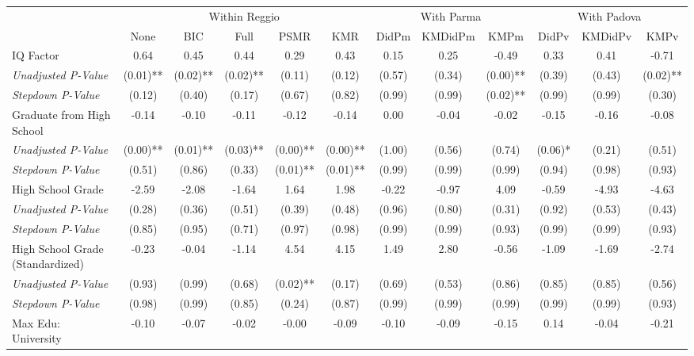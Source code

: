 \begin{tabular}{l c c c c c c c c c c c}
\toprule
& \multicolumn{5}{c}{Within Reggio} & \multicolumn{3}{c}{With Parma} & \multicolumn{3}{c}{With Padova} \\\cmidrule(lr){2-6} \cmidrule(lr){7-9} \cmidrule(lr){10-12}
 & None & BIC & Full & PSMR & KMR & DidPm & KMDidPm & KMPm & DidPv & KMDidPv & KMPv \\
\midrule
IQ Factor & 0.64 & 0.45 & 0.44 & 0.29 & 0.43 & 0.15 & 0.25 & -0.49 & 0.33 & 0.41 & -0.71 \\
\quad \textit{Unadjusted P-Value} & (0.01)** & (0.02)** & (0.02)** & (0.11) & (0.12) & (0.57) & (0.34) & (0.00)** & (0.39) & (0.43) & (0.02)** \\
\quad \textit{Stepdown P-Value} & (0.12) & (0.40) & (0.17) & (0.67) & (0.82) & (0.99) & (0.99) & (0.02)** & (0.99) & (0.99) & (0.30) \\
Graduate from High School & -0.14 & -0.10 & -0.11 & -0.12 & -0.14 & 0.00 & -0.04 & -0.02 & -0.15 & -0.16 & -0.08 \\
\quad \textit{Unadjusted P-Value} & (0.00)** & (0.01)** & (0.03)** & (0.00)** & (0.00)** & (1.00) & (0.56) & (0.74) & (0.06)* & (0.21) & (0.51) \\
\quad \textit{Stepdown P-Value} & (0.51) & (0.86) & (0.33) & (0.01)** & (0.01)** & (0.99) & (0.99) & (0.99) & (0.94) & (0.98) & (0.93) \\
High School Grade & -2.59 & -2.08 & -1.64 & 1.64 & 1.98 & -0.22 & -0.97 & 4.09 & -0.59 & -4.93 & -4.63 \\
\quad \textit{Unadjusted P-Value} & (0.28) & (0.36) & (0.51) & (0.39) & (0.48) & (0.96) & (0.80) & (0.31) & (0.92) & (0.53) & (0.43) \\
\quad \textit{Stepdown P-Value} & (0.85) & (0.95) & (0.71) & (0.97) & (0.98) & (0.99) & (0.99) & (0.93) & (0.99) & (0.99) & (0.93) \\
High School Grade (Standardized) & -0.23 & -0.04 & -1.14 & 4.54 & 4.15 & 1.49 & 2.80 & -0.56 & -1.09 & -1.69 & -2.74 \\
\quad \textit{Unadjusted P-Value} & (0.93) & (0.99) & (0.68) & (0.02)** & (0.17) & (0.69) & (0.53) & (0.86) & (0.85) & (0.85) & (0.56) \\
\quad \textit{Stepdown P-Value} & (0.98) & (0.99) & (0.85) & (0.24) & (0.87) & (0.99) & (0.99) & (0.99) & (0.99) & (0.99) & (0.93) \\
Max Edu: University & -0.10 & -0.07 & -0.02 & -0.00 & -0.09 & -0.10 & -0.09 & -0.15 & 0.14 & -0.04 & -0.21 \\

\end{tabular}
